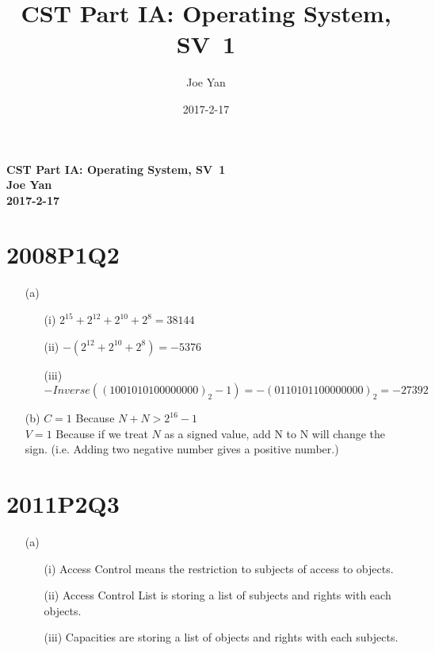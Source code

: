 \documentclass[10pt,twoside,a4paper]{article}
\newcommand{\studentname}{Joe Yan}
\newcommand{\svworkdate}{2017-2-17}
\newcommand{\svcourse}{CST Part IA: Operating System}
\newcommand{\svnumber}{1}
\begin{document}
\author{\studentname}
\title{\svcourse, SV~\svnumber}
\date{\svworkdate}

\textbf{\svcourse, SV~\svnumber}\\
\textbf{\studentname}\\
\textbf{\svworkdate}\\

\section{2008P1Q2}
\begin{itemize}
\item[(a)]
\begin{itemize}
\item[(i)] $2^{15}+2^{12}+2^{10}+2^8=38144$
\item[(ii)] $-(2^{12}+2^{10}+2^8)=-5376$
\item[(iii)] $- Inverse((1001 0101 0000 0000)_2 -1)=-(0110 1011 0000 0000)_2=-27392$
\end{itemize}
\item[(b)]
$C=1$ Because $N+N>2^{16}-1$
\\$V=1$ Because if we treat $N$ as a signed value, add N to N will change the sign. (i.e. Adding two negative number gives a positive number.)
\end{itemize}

\section{2011P2Q3}
\begin{itemize}
\item[(a)]
\begin{itemize}
\item[(i)] Access Control means the restriction to subjects of access to objects.
\item[(ii)] Access Control List is storing a list of subjects and rights with each objects.
\item[(iii)] Capacities are storing a list of objects and rights with each subjects.
\end{itemize}
\end{itemize}
\end{document}
